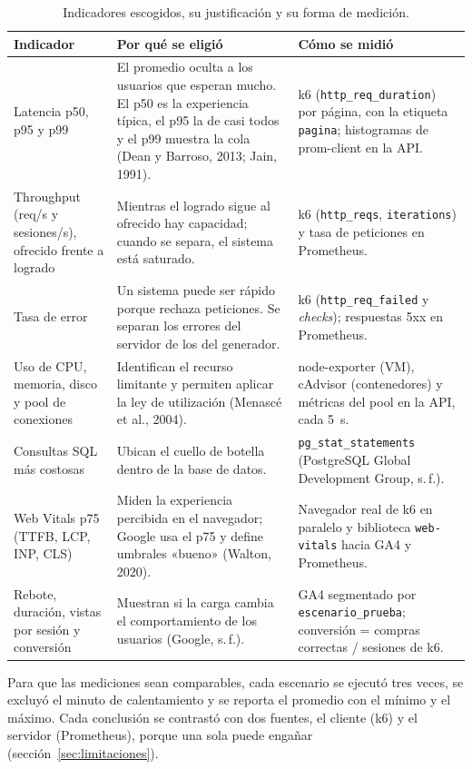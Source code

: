 \documentclass[11pt,a4paper]{article}
\newcommand{\codigo}[1]{\texttt{#1}}
\begin{document}
\begin{table}[H]
\centering\small
\begin{tabularx}{\textwidth}{@{}>{\raggedright\arraybackslash}p{2.9cm}>{\raggedright\arraybackslash}X>{\raggedright\arraybackslash}X@{}}
\toprule
Indicador & Por qué se eligió & Cómo se midió \\
\midrule
Latencia p50, p95 y p99 &
  El promedio oculta a los usuarios que esperan mucho. El p50 es la
  experiencia típica, el p95 la de casi todos y el p99 muestra la cola
  (Dean y Barroso, 2013; Jain, 1991). &
  k6 (\codigo{http\_req\_duration}) por página, con la etiqueta
  \codigo{pagina}; histogramas de prom-client en la API. \\
Throughput (req/s y sesiones/s), ofrecido frente a logrado &
  Mientras el logrado sigue al ofrecido hay capacidad; cuando se separa, el
  sistema está saturado. &
  k6 (\codigo{http\_reqs}, \codigo{iterations}) y tasa de peticiones en
  Prometheus. \\
Tasa de error &
  Un sistema puede ser rápido porque rechaza peticiones. Se separan los
  errores del servidor de los del generador. &
  k6 (\codigo{http\_req\_failed} y \emph{checks}); respuestas 5xx en
  Prometheus. \\
Uso de CPU, memoria, disco y pool de conexiones &
  Identifican el recurso limitante y permiten aplicar la ley de utilización
  (Menascé et al., 2004). &
  node-exporter (VM), cAdvisor (contenedores) y métricas del pool en la
  API, cada 5~s. \\
Consultas SQL más costosas &
  Ubican el cuello de botella dentro de la base de datos. &
  \codigo{pg\_stat\_statements} (PostgreSQL Global Development Group, s.\,f.). \\
Web Vitals p75 (TTFB, LCP, INP, CLS) &
  Miden la experiencia percibida en el navegador; Google usa el p75 y define
  umbrales «bueno» (Walton, 2020). &
  Navegador real de k6 en paralelo y biblioteca \codigo{web-vitals} hacia GA4
  y Prometheus. \\
Rebote, duración, vistas por sesión y conversión &
  Muestran si la carga cambia el comportamiento de los usuarios
  (Google, s.\,f.). &
  GA4 segmentado por \codigo{escenario\_prueba}; conversión = compras
  correctas / sesiones de k6. \\
\bottomrule
\end{tabularx}
\caption{Indicadores escogidos, su justificación y su forma de medición.}
\end{table}

Para que las mediciones sean comparables, cada escenario se ejecutó tres veces,
se excluyó el minuto de calentamiento y se reporta el promedio con el mínimo y
el máximo. Cada conclusión se contrastó con dos fuentes, el cliente (k6) y el
servidor (Prometheus), porque una sola puede engañar (sección~\ref{sec:limitaciones}).
\end{document}
